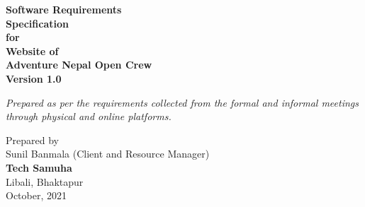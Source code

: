 	\begin{center}
		\thispagestyle{empty}
		\Large\textbf{Software Requirements}\\
		\Large\textbf{Specification}\\
		\vspace{0.4in}
		\large{\textbf{for}\\}
		\vspace{0.4in}
		\Large\textbf{Website of\\Adventure Nepal Open Crew }\\
		\vspace{0.8in}
		\large{\textbf{Version 1.0}\\}
		\vspace{1in}
		
		
		\large{\textit{Prepared as per the requirements collected from the formal and informal meetings through physical and online platforms.\\}}
		
		
		\vspace{1in}
		\large{Prepared by}\\
		\large{Sunil Banmala (Client and Resource Manager)}\\


		\vspace{2.5in}
		\large{\textbf{Tech Samuha}\\}
			\normalsize{Libali, Bhaktapur\\
			October, 2021
		}
	\end{center}
